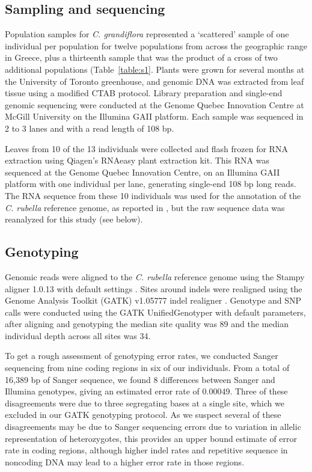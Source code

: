 \subsection{Sampling and sequencing}
Population samples for \textit{C. grandiflora} represented a ‘scattered’ sample of one individual per population for twelve populations from across the geographic range in Greece, plus a thirteenth sample that was the product of a cross of two additional populations (Table~\ref{table:s1}. Plants were grown for several months at the University of Toronto greenhouse, and genomic DNA was extracted from leaf tissue using a modified CTAB protocol. Library preparation and single-end genomic sequencing were conducted at the Genome Quebec Innovation Centre at McGill University on the Illumina GAII platform. Each sample was sequenced in 2 to 3 lanes and with a read length of 108 bp.

Leaves from 10 of the 13 individuals were collected and flash frozen for RNA extraction using Qiagen's RNAeasy plant extraction kit. This RNA was sequenced at the Genome Quebec Innovation Centre, on an Illumina GAII platform with one individual per lane, generating single-end 108 bp long reads. The RNA sequence from these 10 individuals was used for the annotation of the \textit{C. rubella} reference genome, as reported in \citep{Slotte2013-py}, but the raw sequence data was reanalyzed for this study (see below).

\subsection{Genotyping}
Genomic reads were aligned to the \textit{C. rubella} reference genome \citep{Slotte2013-py} using the Stampy aligner 1.0.13 with default settings \citep{Lunter2011-uc}. Sites around indels were realigned using the Genome Analysis Toolkit (GATK) v1.05777 indel realigner \citep{DePristo2011-jc}. Genotype and SNP calls were conducted using the GATK UnifiedGenotyper with default parameters, after aligning and genotyping the median site quality was 89 and the median individual depth across all sites was 34. 

To get a rough assessment of genotyping error rates, we conducted Sanger sequencing from nine coding regions in six of our individuals. From a total of 16,389 bp of Sanger sequence, we found 8 differences between Sanger and Illumina genotypes, giving an estimated error rate of 0.00049. Three of these disagreements were due to three segregating bases at a single site, which we excluded in our GATK genotyping protocol. As we suspect several of these disagreements may be due to Sanger sequencing errors due to variation in allelic representation of heterozygotes, this provides an upper bound estimate of error rate in coding regions, although higher indel rates and repetitive sequence in noncoding DNA may lead to a higher error rate in those regions. 

